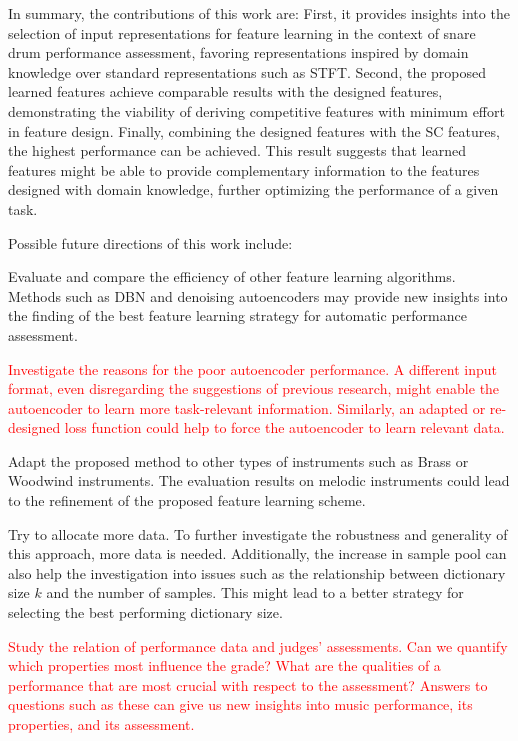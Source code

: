 \documentclass{ws-ijsc}
\newcommand{\highlight}[1]{\textcolor{red}{#1}}
\begin{document}
In summary, the contributions of this work are: 
First, it provides insights into the selection of input representations for feature learning in the context of snare drum performance assessment, favoring representations inspired by domain knowledge over standard representations such as STFT. 
Second, the proposed learned features achieve comparable results with the designed features, demonstrating the viability of deriving competitive features with minimum effort in feature design. 
Finally, combining the designed features with the SC features, the highest performance can be achieved. This result suggests that learned features might be able to provide complementary information to the features designed with domain knowledge, further optimizing the performance of a given task. 

Possible future directions of this work include: 
\begin{enumerate}[(i)]
    \item   Evaluate and compare the efficiency of other feature learning algorithms. Methods such as DBN\cite{Hamel2010} and denoising autoencoders \cite{Vincent2008} may provide new insights into the finding of the best feature learning strategy for automatic performance assessment.
    \highlight{\item   Investigate the reasons for the poor autoencoder performance. A different input format, even disregarding the suggestions of previous research, might enable the autoencoder to learn more task-relevant information. Similarly, an adapted or re-designed loss function could help to force the autoencoder to learn relevant data.}
    \item   Adapt the proposed method to other types of instruments such as Brass or Woodwind instruments. The evaluation results on melodic instruments could lead to the refinement of the proposed feature learning scheme. 
    \item   Try to allocate more data. To further investigate the robustness and generality of this approach, more data is needed. Additionally, the increase in sample pool can also help the investigation into issues such as the relationship between dictionary size $k$ and the number of samples. This might lead to a better strategy for selecting the best performing dictionary size. 
    \highlight{\item   Study the relation of performance data and judges' assessments. Can we quantify which properties most influence the grade? What are the qualities of a performance that are most crucial with respect to the assessment? Answers to questions such as these can give us new insights into music performance, its properties, and its assessment.}
\end{enumerate}
\end{document}
